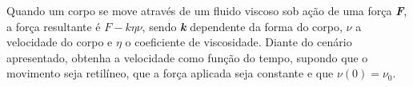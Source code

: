 \linespread{1.5}
Quando um corpo se move através de um fluido viscoso sob ação de uma força \textbf{\textit{F}}, a força resultante é \textbf{$F-k\eta\nu$}, sendo \textit{\textbf{k}} dependente da forma do corpo, \textbf{$\nu$} a velocidade do corpo e \textbf{$\eta$} o coeficiente de viscosidade. Diante do cenário apresentado, obtenha a velocidade como função do tempo, supondo que o movimento seja retilíneo, que a força aplicada seja constante e que $\nu(0) = \nu_0$.